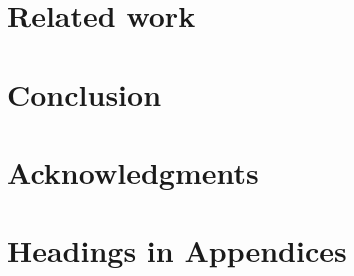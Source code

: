 \documentclass{sig-alternate-05-2015}
\begin{document}
\section{Related work}

\section{Conclusion}

\section{Acknowledgments}



\appendix

\section{Headings in Appendices}
\end{document}
